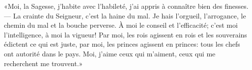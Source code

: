 «Moi, la Sagesse, j’habite avec l’habileté,
	j’ai appris à connaître bien des finesses.
--- La crainte du Seigneur, c’est la haine du mal.
	Je hais l’orgueil, l’arrogance, le chemin du mal et la bouche perverse.
À moi le conseil et l’efficacité;
	c’est moi l’intelligence, à moi la vigueur!
Par moi, les rois agissent en rois et les souverains édictent ce qui est juste,
	par moi, les princes agissent en princes:
	tous les chefs ont autorité dans le pays.
Moi, j’aime ceux qui m’aiment, ceux qui me recherchent me trouvent.»